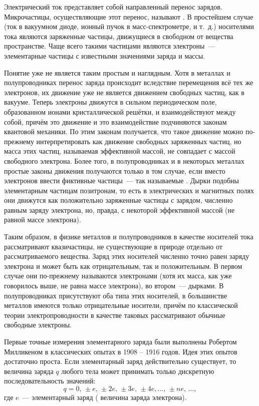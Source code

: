 
Электрический ток представляет собой направленный перенос зарядов. Микрочастицы, осуществляющие этот перенос, называют . В простейшем случае (ток в вакуумном диоде, ионный пучок в масс-спектрометре, и т.~д.) носителями тока являются заряженные частицы, движущиеся в свободном от вещества пространстве. Чаще всего такими частицами являются электроны~--- элементарные частицы с известными значениями заряда и массы.

Понятие  уже не является таким простым и наглядным. Хотя в металлах и полупроводниках перенос заряда происходит вследствие перемещения всё тех же электронов, их движение уже не является движением свободных частиц, как в вакууме. Теперь электроны движутся в сильном периодическом поле, образованном ионами кристаллической решётки, и взаимодействуют между собой, причём это движение и это взаимодействие подчиняются законам квантовой механики. По этим законам получается, что такое движение можно по-прежнему интерпретировать как движение свободных заряженных частиц, но масса этих частиц, называемая эффективной массой, не совпадает с массой свободного электрона. Более того, в полупроводниках и в некоторых металлах простые законы движения получаются только в том случае, если вместо электронов ввести фиктивные частицы~--- так называемые . Дырки подобны элементарным частицам позитронам, то есть в электрических и магнитных полях они движутся как положительно заряженные частицы с зарядом, численно равным заряду электрона, но, правда, с некоторой эффективной массой (не равной массе электрона).

Таким образом, в физике металлов и полупроводников в качестве носителей тока рассматривают квазичастицы, не существующие в природе отдельно от рассматриваемого вещества. Заряд этих носителей численно точно равен заряду электрона и может быть как отрицательным, так и положительным. В первом случае они по-прежнему называются электронами (хотя их масса, как уже говорилось выше, не равна массе электрона), во втором~--- дырками. В полупроводниках присутствуют оба типа этих носителей, в большинстве металлов имеются только отрицательные носители, причём по классической теории электропроводности в качестве таковых рассматривают обычные свободные электроны.


Первые точные измерения элементарного заряда были выполнены Робертом Милликеном в классических опытах в 1908 -- 1916 годов. Идея этих опытов достаточно проста. Если элементарный заряд действительно существует, то величина заряда $q$ любого тела может принимать только дискретную последовательность значений:
\begin{equation*}
	q = 0,\,\pm e,\,\pm2e,\,\pm3e,\,\pm4e, \ldots,\, \pm ne,\, \ldots,
\end{equation*}
где $e$~--- элементарный заряд ( величина заряда электрона).

